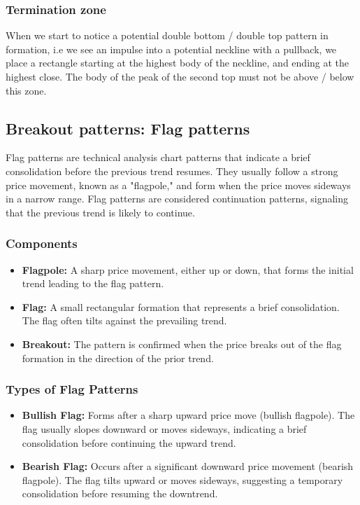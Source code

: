 \documentclass{report}
\begin{document}
     \bigbreak \noindent 
     \subsubsection{Termination zone}
     \bigbreak \noindent 
     When we start to notice a potential double bottom / double top pattern in formation, i.e we see an impulse into a potential neckline with a pullback, we place a rectangle starting at the highest body of the neckline, and ending at the highest close. The body of the peak of the second top must not be above / below this zone.
     \bigbreak \noindent 

     \bigbreak \noindent 
     \subsection{Breakout patterns: Flag patterns}
     \bigbreak \noindent 
     Flag patterns are technical analysis chart patterns that indicate a brief consolidation before the previous trend resumes. They usually follow a strong price movement, known as a "flagpole," and form when the price moves sideways in a narrow range. Flag patterns are considered continuation patterns, signaling that the previous trend is likely to continue.
     \bigbreak \noindent 
     \subsubsection{Components}
     \begin{itemize}
         \item \textbf{Flagpole:} A sharp price movement, either up or down, that forms the initial trend leading to the flag pattern.
         \item \textbf{Flag:} A small rectangular formation that represents a brief consolidation. The flag often tilts against the prevailing trend.
         \item \textbf{Breakout:} The pattern is confirmed when the price breaks out of the flag formation in the direction of the prior trend.
     \end{itemize}
     \bigbreak \noindent 
     \subsubsection{Types of Flag Patterns}
     \bigbreak \noindent 
     \begin{itemize}
         \item \textbf{Bullish Flag:} Forms after a sharp upward price move (bullish flagpole). The flag usually slopes downward or moves sideways, indicating a brief consolidation before continuing the upward trend.
         \item \textbf{Bearish Flag:} Occurs after a significant downward price movement (bearish flagpole). The flag tilts upward or moves sideways, suggesting a temporary consolidation before resuming the downtrend.
     \end{itemize}
\end{document}
